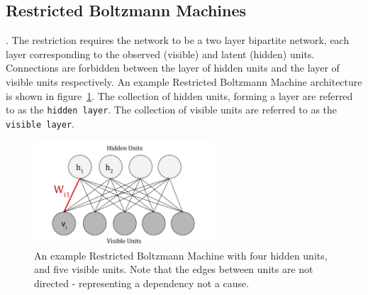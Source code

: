 \subsection{Restricted Boltzmann Machines}


. The restriction requires the network to be a two layer bipartite network, each layer corresponding to the observed (visible) and latent (hidden) units. Connections are forbidden between the layer of hidden units and the layer of visible units respectively. An example Restricted Boltzmann Machine architecture is shown in figure~\ref{F:Restricted-Boltzmann-Machine}. The collection of hidden units, forming a layer are referred to as the \texttt{hidden layer}. The collection of visible units are referred to as the \texttt{visible layer}.

\begin{figure}[h]
\begin{center}
  \includegraphics[width = 0.6\textwidth]{Assets/RBM_Example.png}
\caption{An example Restricted Boltzmann Machine with four hidden units, and five visible units. Note that the edges between units are not directed - representing a dependency not a cause. }
\label{F:Restricted-Boltzmann-Machine}
\end{center}
\end{figure}

